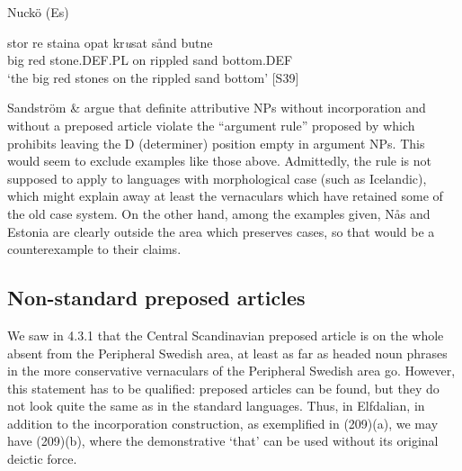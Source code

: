 
\item 

Nuckö (Es)



 \ea\label{}
\gll stor  re  staina  opat  kr\textit{u}sat  sånd  butne\\


big  red  stone.DEF.PL  on  rippled  sand  bottom.DEF\\

\glt ‘the big red stones on the rippled sand bottom’ [S39]

\z

Sandström \& \citet[110]{Holmberg2003} argue that definite attributive NPs without incorporation and without a preposed article violate the “argument rule” proposed by \citet{Delsing1993} which prohibits leaving the D (determiner) position empty in argument NPs. This would seem to exclude examples like those above. Admittedly, the rule is not supposed to apply to languages with morphological case (such as Icelandic), which might explain away at least the vernaculars which have retained some of the old case system. On the other hand, among the examples given, Nås and Estonia are clearly outside the area which preserves cases, so that would be a counterexample to their claims. 


\subsection{Non-standard preposed articles }
\label{bkm:Ref264372580}\label{bkm:Ref264372864}\label{bkm:Ref264372909}
We saw in 4.3.1 that the Central Scandinavian preposed article is on the whole absent from the Peripheral Swedish area, at least as far as headed noun phrases in the more conservative vernaculars of the Peripheral Swedish area go. However, this statement has to be qualified: preposed articles can be found, but they do not look quite the same as in the standard languages. Thus, in Elfdalian, in addition to the incorporation construction, as exemplified in (209)(a), we may have (209)(b), where the demonstrative  ‘that’ can be used without its original deictic force.

